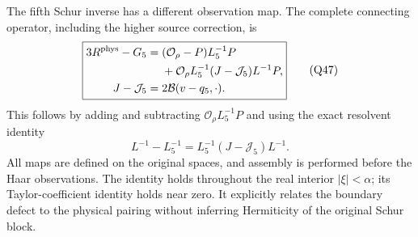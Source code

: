 \documentclass[11pt]{article}
\begin{document}
The fifth Schur inverse has a different observation map. The complete connecting operator, including the higher source correction, is
\[
 \boxed{\begin{aligned}
 3R^{\rm phys}-G_5
 ={}&(\mathcal O_\rho-P)L_5^{-1}P\\
 &+\mathcal O_\rho L_5^{-1}(J-\mathcal J_5)L^{-1}P,\\
 J-\mathcal J_5={}&2\mathcal B(v-q_5,\cdot).
 \end{aligned}}\tag{Q47}
\]
This follows by adding and subtracting \(\mathcal O_\rho L_5^{-1}P\) and using the exact resolvent identity
\[
 L^{-1}-L_5^{-1}=L_5^{-1}(J-\mathcal J_5)L^{-1}.
\]
All maps are defined on the original spaces, and assembly is performed before the Haar observations. The identity holds throughout the real interior \(|\xi|<\alpha\); its Taylor-coefficient identity holds near zero. It explicitly relates the boundary defect to the physical pairing without inferring Hermiticity of the original Schur block.
\end{document}
